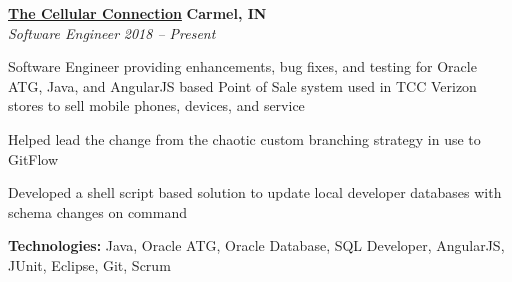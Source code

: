 %
    \headerrow
        {\textbf{\href{https://www.tccrocks.com/}{The Cellular Connection}}}
        {\textbf{Carmel, IN}}
    \\
    \headerrow
        {\emph{Software Engineer}}
        {\emph{2018 -- Present}}
    \begin{itemize*}
        \item Software Engineer providing enhancements, bug fixes, and testing for Oracle ATG, Java,
            and AngularJS based Point of Sale system used in TCC Verizon stores to sell mobile phones, devices, and service
        \item Helped lead the change from the chaotic custom branching strategy in use to GitFlow
        \item Developed a shell script based solution to update local developer databases with schema changes on command
    \end{itemize*}

    \hspace{1.0em}
        {\textbf{Technologies:} Java, Oracle ATG, Oracle Database, SQL Developer, AngularJS, JUnit, Eclipse, Git, Scrum}
